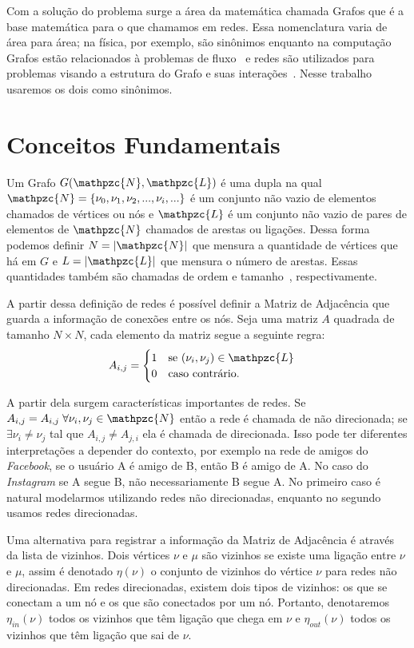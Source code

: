 Com a solução do problema surge a área da matemática chamada Grafos que é a base matemática para o que chamamos em redes. Essa nomenclatura varia de área para área; na física, por exemplo, são sinônimos enquanto na computação Grafos estão relacionados à problemas de fluxo~\cite{Grafos01,Grafos} e redes são utilizados para problemas visando a estrutura do Grafo e suas interações~\cite{network,networks}. Nesse trabalho usaremos os dois como sinônimos.

\section{Conceitos Fundamentais}

Um Grafo $G(\mathpzc{N} ,\mathpzc{L})$ é uma dupla na qual $\mathpzc{N} = \{\nu_0,\nu_1,\nu_2,...,\nu_i,...\}$ é um conjunto não vazio de elementos chamados de vértices ou 
nós e $\mathpzc{L}$ é um conjunto não vazio de pares 
de elementos de $\mathpzc{N}$ chamados de 
arestas ou ligações. Dessa forma podemos definir $N = |\mathpzc{N}|$ que mensura a quantidade de vértices que há em $G$ e $L= |\mathpzc{L}|$ que mensura o número de arestas. Essas quantidades também são chamadas de ordem e tamanho~\cite{Grafos}, respectivamente.

A partir dessa definição de redes é possível definir a Matriz de Adjacência que guarda a informação de 
conexões entre os nós. Seja uma matriz $A$ quadrada de tamanho $N \times N$, cada elemento da matriz segue a seguinte regra:
\[   
  A_{i,j} = 
     \begin{cases}
       1 \quad 
       \text{se } (\nu_i,\nu_j)\in \mathpzc{L}\\
       0 \quad \text{caso contrário.} \\
     \end{cases}
\]

A partir dela surgem características importantes de redes. Se $A_{i,j} = A_{i,j}\; \forall \nu_i,\nu_j \in \mathpzc{N}$ então a rede é chamada de não direcionada; se $\exists \nu_i\neq \nu_j$ tal que 
$A_{i,j} \neq A_{j,i}$ 
ela é chamada de direcionada. Isso pode ter diferentes interpretações a depender do contexto, por exemplo na rede de amigos do \textit{Facebook}, se o usuário A é amigo de B, então B é amigo de A. No caso do \textit{Instagram} se A segue B, não necessariamente B segue A. No primeiro caso é natural modelarmos utilizando redes não direcionadas, enquanto no segundo usamos redes direcionadas.

Uma alternativa para registrar a informação da Matriz de Adjacência é através da lista de vizinhos. Dois vértices $\nu$ e $\mu$ são vizinhos se existe uma ligação entre $\nu$ e $\mu$, assim é denotado $\eta(\nu)$ o conjunto de vizinhos do vértice $\nu$ para redes não direcionadas. Em redes direcionadas, existem dois tipos de vizinhos: os que se conectam a um nó e os que são conectados por um nó. Portanto, denotaremos $\eta_{in}(\nu)$ todos os vizinhos que têm ligação que chega em $\nu$ e $\eta_{out}(\nu)$ todos os vizinhos que têm ligação que sai de $\nu$.

